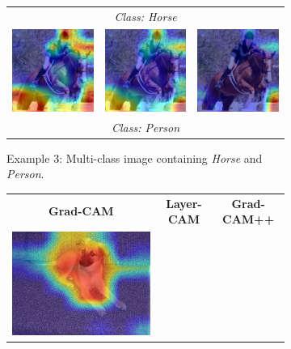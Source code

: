 \begin{figure}[!t]
{\begin{minipage}{0.9\textwidth}
\begin{subfigure}[t]{0.48\textwidth}
\begin{tabular}{c c c}
          \multicolumn{3}{c}{{\scriptsize \textit{Class: Horse}}} \\[2pt]
          \includegraphics[width=0.32\linewidth, height=0.32\linewidth]{figures/cams/gradcam/2008_002762_14} &
          \includegraphics[width=0.32\linewidth, height=0.32\linewidth]{figures/cams/layercam/2008_002762_14} &
          \includegraphics[width=0.32\linewidth, height=0.32\linewidth]{figures/cams/gradcampp/2008_002762_14} \\
          \multicolumn{3}{c}{{\scriptsize \textit{Class: Person}}} \\
        \end{tabular}
        \caption{Example 3: Multi-class image containing \textit{Horse} and \textit{Person}.}
        \label{fig:cam_multiclass_c}
      \end{subfigure}
      \hfill
      \begin{subfigure}[t]{0.48\textwidth}
        \centering
        \begin{tabular}{c c c}
          {\scriptsize \textbf{Grad-CAM}} & {\scriptsize \textbf{Layer-CAM}} & {\scriptsize \textbf{Grad-CAM++}} \\[2pt]
          \includegraphics[width=0.32\linewidth, height=0.32\linewidth]{figures/cams/gradcam/2010_001933_11} &

\end{tabular}
\end{subfigure}
\end{minipage}}
\end{figure}
